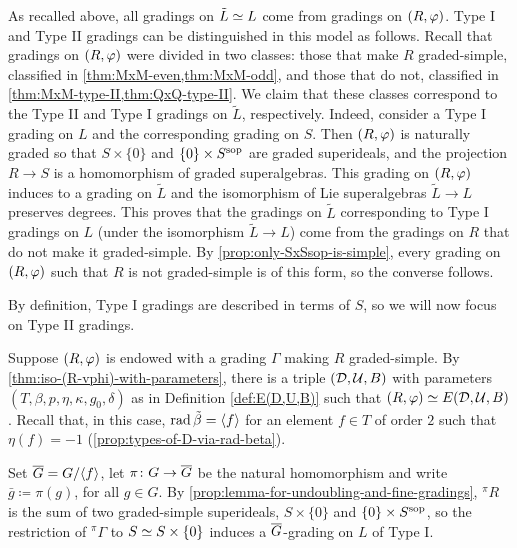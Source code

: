 As recalled above, all gradings on $\tilde L \simeq L$ come from gradings on $(R, \varphi)$. 
Type I and Type II gradings can be distinguished in this model as follows. 
Recall that gradings on $(R, \varphi)$ were divided in two classes: those that make $R$ graded-simple, classified in \cref{thm:MxM-even,thm:MxM-odd}, and those that do not, classified in \cref{thm:MxM-type-II,thm:QxQ-type-II}. 
We claim that these classes correspond to the Type II and Type I gradings on $\tilde L$, respectively. 
Indeed, consider a Type I grading on $L$ and the corresponding grading on $S$. 
Then $(R, \varphi)$ is naturally graded so that $S\times \{ 0 \}$ and $\{0\} \times S^{\mathrm{sop}}$ are graded superideals, and the projection $R \to S$ is a homomorphism of graded superalgebras. 
This grading on $(R, \varphi)$ induces to a grading on $\tilde L$ and the isomorphism of Lie superalgebras $\tilde L \to L$ preserves degrees. 
This proves that the gradings on $\tilde L$ corresponding to Type I gradings on $L$ (under the isomorphism $\tilde L \to L$) come from the gradings on $R$ that do not make it graded-simple. 
By \cref{prop:only-SxSsop-is-simple}, every grading on $(R, \varphi)$ such that $R$ is not graded-simple is of this form, so the converse follows. 

By definition, Type I gradings are described in terms of $S$, so we will now focus on Type II gradings. 

Suppose $(R, \varphi)$ is endowed with a grading $\Gamma$ making $R$ graded-simple. 
By \cref{thm:iso-(R-vphi)-with-parameters}, there is a triple $(\mathcal{D}, \mathcal U, B)$ with parameters $(T, \beta, p, \eta, \kappa, g_0, \delta)$ as in Definition \ref{def:E(D,U,B)} such that $(R, \varphi) \simeq E(\mathcal{D}, \mathcal U, B)$. 
Recall that, in this case, $\operatorname{rad} \tilde\beta = \langle f \rangle$ for an element $f\in T$ of order $2$ such that $\eta(f) = -1$ (\cref{prop:types-of-D-via-rad-beta}). 

Set $\barr G = G/\langle f \rangle$, let  $\pi\from G\to \barr G$ be the natural homomorphism and write $\bar g \coloneqq \pi(g)$, for all $g\in G$. 
By \cref{prop:lemma-for-undoubling-and-fine-gradings}, ${}^\pi R$ is the sum of two graded-simple superideals, $S\times \{ 0 \}$ and $\{0\} \times S^{\mathrm{sop}}$, so the restriction of ${}^\pi \Gamma$ to $S \simeq S\times \{ 0 \}$ induces a $\barr G$-grading on $L$ of Type I. 

